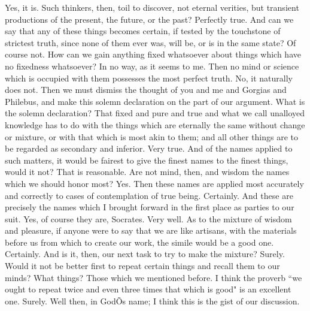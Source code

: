 \documentclass[letterpaper,12pt]{article}
\newcommand{\stephpag}[1]{\marginnote{\small\itshape\fontfamily{ppl}\selectfont #1}}
\begin{document}
\begin{drama}
\protarchusspeaks
Yes, it is.
\socratesspeaks
Such thinkers, then, toil to discover, not eternal verities, but transient productions of the present, the future, or the past?
\protarchusspeaks
Perfectly true.
\socratesspeaks
And can we say that any of these things becomes certain, if tested by the touchstone of strictest truth, \stephpag{b} since none of them ever was, will be, or is in the same state?
\protarchusspeaks
Of course not.
\socratesspeaks
How can we gain anything fixed whatsoever about things which have no fixedness whatsoever?
\protarchusspeaks
In no way, as it seems to me.
\socratesspeaks
Then no mind or science which is occupied with them possesses the most perfect truth.
\protarchusspeaks
No, it naturally does not.
\socratesspeaks
Then we must dismiss the thought of you and me and Gorgias and Philebus, and make this solemn declaration \stephpag{c} on the part of our argument.
\protarchusspeaks
What is the solemn declaration?
\socratesspeaks
That fixed and pure and true and what we call unalloyed knowledge has to do with the things which are eternally the same without change or mixture, or with that which is most akin to them; and all other things are to be regarded as secondary and inferior.
\protarchusspeaks
Very true.
\socratesspeaks
And of the names applied to such matters, it would be fairest to give the finest names to the finest things, would it not?
\protarchusspeaks
That is reasonable. \stephpag{d}
\socratesspeaks
Are not mind, then, and wisdom the names which we should honor most?
\protarchusspeaks
Yes.
\socratesspeaks
Then these names are applied most accurately and correctly to cases of contemplation of true being.
\protarchusspeaks
Certainly.
\socratesspeaks
And these are precisely the names which I brought forward in the first place as parties to our suit.
\protarchusspeaks
Yes, of course they are, Socrates.
\socratesspeaks
Very well. As to the mixture of wisdom and pleasure, \stephpag{e} if anyone were to say that we are like artisans, with the materials before us from which to create our work, the simile would be a good one.
\protarchusspeaks
Certainly.
\socratesspeaks
And is it, then, our next task to try to make the mixture?
\protarchusspeaks
Surely.
\socratesspeaks
Would it not be better first to repeat certain things and recall them to our minds?
\protarchusspeaks
What things?
\socratesspeaks
Those which we mentioned before. I think the proverb ``we ought to repeat twice and even three times that which is good" \stephpag{60 a} is an excellent one.
\protarchusspeaks
Surely.
\socratesspeaks
Well then, in GodÕs name; I think this is the gist of our discussion.

\end{drama}
\end{document}
